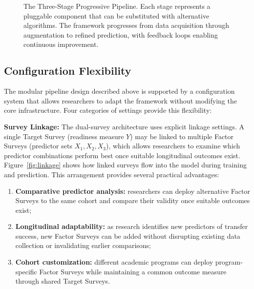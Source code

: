 \documentclass[letterpaper,11pt]{article}
\begin{document}
\begin{figure}[htbp]
{
}%
\caption{The Three-Stage Progressive Pipeline. Each stage represents a pluggable component that can be substituted with alternative algorithms. The framework progresses from data acquisition through augmentation to refined prediction, with feedback loops enabling continuous improvement.}
\label{fig:pipeline}
\end{figure}

\subsection{Configuration Flexibility}\label{subsec:config}

The modular pipeline design described above is supported by a configuration system that allows researchers to adapt the framework without modifying the core infrastructure. Four categories of settings provide this flexibility:

\textbf{Survey Linkage:} The dual-survey architecture uses explicit linkage settings. A single Target Survey (readiness measure $Y$) may be linked to multiple Factor Surveys (predictor sets $X_1, X_2, X_3$), which allows researchers to examine which predictor combinations perform best once suitable longitudinal outcomes exist. Figure~\ref{fig:linkage} shows how linked surveys flow into the model during training and prediction. This arrangement provides several practical advantages:

\begin{enumerate}
    \item \textbf{Comparative predictor analysis:} researchers can deploy alternative Factor Surveys to the same cohort and compare their validity once suitable outcomes exist;
    \item \textbf{Longitudinal adaptability:} as research identifies new predictors of transfer success, new Factor Surveys can be added without disrupting existing data collection or invalidating earlier comparisons;
    \item \textbf{Cohort customization:} different academic programs can deploy program-specific Factor Surveys while maintaining a common outcome measure through shared Target Surveys.
\end{enumerate}
\end{document}
